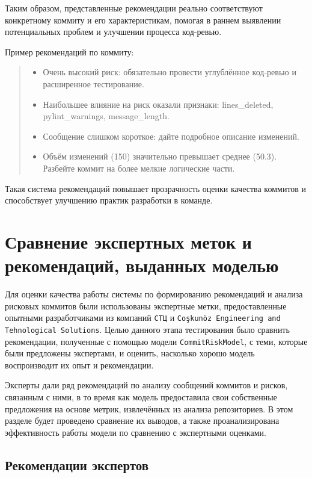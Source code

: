 \begin{itemize}
Таким образом, представленные рекомендации реально соответствуют конкретному коммиту и его характеристикам, помогая в раннем выявлении потенциальных проблем и улучшении процесса код-ревью.

\vspace{0.5em}
Пример рекомендаций по коммиту:

\begin{quote}
	\begin{itemize}
		\item Очень высокий риск: обязательно провести углублённое код-ревью и расширенное тестирование.
		\item  Наибольшее влияние на риск оказали признаки: lines\_deleted, pylint\_warnings, message\_length.
		\item  Сообщение слишком короткое: дайте подробное описание изменений.
		\item Объём изменений (150) значительно превышает среднее (50.3). Разбейте коммит на более мелкие логические части.
	\end{itemize}
\end{quote}

Такая система рекомендаций повышает прозрачность оценки качества коммитов и способствует улучшению практик разработки в команде.

\section{Сравнение экспертных меток и рекомендаций, выданных моделью}

Для оценки качества работы системы по формированию рекомендаций и анализа рисковых коммитов были использованы экспертные метки, предоставленные опытными разработчиками из компаний \texttt{СТЦ} и \texttt{Coşkunöz Engineering and Tehnological Solutions}. Целью данного этапа тестирования было сравнить рекомендации, полученные с помощью модели \texttt{CommitRiskModel}, с теми, которые были предложены экспертами, и оценить, насколько хорошо модель воспроизводит их опыт и рекомендации.

Эксперты дали ряд рекомендаций по анализу сообщений коммитов и рисков, связанным с ними, в то время как модель предоставила свои собственные предложения на основе метрик, извлечённых из анализа репозиториев. В этом разделе будет проведено сравнение их выводов, а также проанализирована эффективность работы модели по сравнению с экспертными оценками.

\subsection{Рекомендации экспертов}


\end{itemize}
